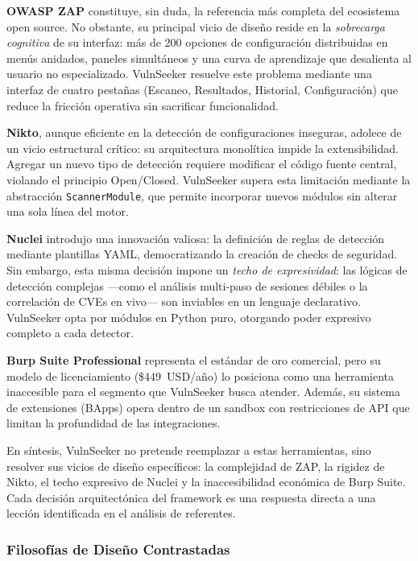 \documentclass[12pt, a4paper]{article}
\begin{document}
\textbf{OWASP ZAP} constituye, sin duda, la referencia más completa del
ecosistema open source. No obstante, su principal vicio de diseño reside en la
\textit{sobrecarga cognitiva} de su interfaz: más de 200 opciones de
configuración distribuidas en menús anidados, paneles simultáneos y una curva de
aprendizaje que desalienta al usuario no especializado. VulnSeeker resuelve este
problema mediante una interfaz de cuatro pestañas (Escaneo, Resultados,
Historial, Configuración) que reduce la fricción operativa sin sacrificar
funcionalidad.

\textbf{Nikto}, aunque eficiente en la detección de configuraciones inseguras,
adolece de un vicio estructural crítico: su arquitectura monolítica impide la
extensibilidad. Agregar un nuevo tipo de detección requiere modificar el código
fuente central, violando el principio Open/Closed. VulnSeeker supera esta
limitación mediante la abstracción \texttt{ScannerModule}, que permite
incorporar nuevos módulos sin alterar una sola línea del motor.

\textbf{Nuclei} introdujo una innovación valiosa: la definición de reglas de
detección mediante plantillas YAML, democratizando la creación de checks de
seguridad. Sin embargo, esta misma decisión impone un \textit{techo de
expresividad}: las lógicas de detección complejas ---como el análisis
multi-paso de sesiones débiles o la correlación de CVEs en vivo--- son
inviables en un lenguaje declarativo. VulnSeeker opta por módulos en Python
puro, otorgando poder expresivo completo a cada detector.

\textbf{Burp Suite Professional} representa el estándar de oro comercial, pero
su modelo de licenciamiento (\$449~USD/año) lo posiciona como una herramienta
inaccesible para el segmento que VulnSeeker busca atender. Además, su sistema
de extensiones (BApps) opera dentro de un sandbox con restricciones de API que
limitan la profundidad de las integraciones.

En síntesis, VulnSeeker no pretende reemplazar a estas herramientas, sino
resolver sus vicios de diseño específicos: la complejidad de ZAP, la rigidez de
Nikto, el techo expresivo de Nuclei y la inaccesibilidad económica de Burp
Suite. Cada decisión arquitectónica del framework es una respuesta directa a una
lección identificada en el análisis de referentes.

\subsubsection{Filosofías de Diseño Contrastadas}
\end{document}
